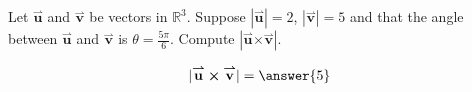 \documentclass{ximera}
\author{Gregory Hartman \and Matthew Carr}
\begin{document}
\begin{exercise}
Let $\overset{\boldsymbol{\rightharpoonup}}{\mathbf{u}}$ and $\overset{\boldsymbol{\rightharpoonup}}{\mathbf{v}}$ be vectors in $\mathbb{R}^3$. Suppose
$|\overset{\boldsymbol{\rightharpoonup}}{\mathbf{u}}|=2$, $|\overset{\boldsymbol{\rightharpoonup}}{\mathbf{v}}|=5$ and that the angle between $\overset{\boldsymbol{\rightharpoonup}}{\mathbf{u}}$ and
$\overset{\boldsymbol{\rightharpoonup}}{\mathbf{v}}$ is $\theta=\frac{5\pi}{6}$. Compute
$|\overset{\boldsymbol{\rightharpoonup}}{\mathbf{u}} \boldsymbol\times \overset{\boldsymbol{\rightharpoonup}}{\mathbf{v}}|$.

\begin{prompt}
\[
|\overset{\boldsymbol{\rightharpoonup}}{\mathbf{u}} \boldsymbol\times \overset{\boldsymbol{\rightharpoonup}}{\mathbf{v}}|=\answer{5}
\]
\end{prompt}


\end{exercise}
\end{document}
